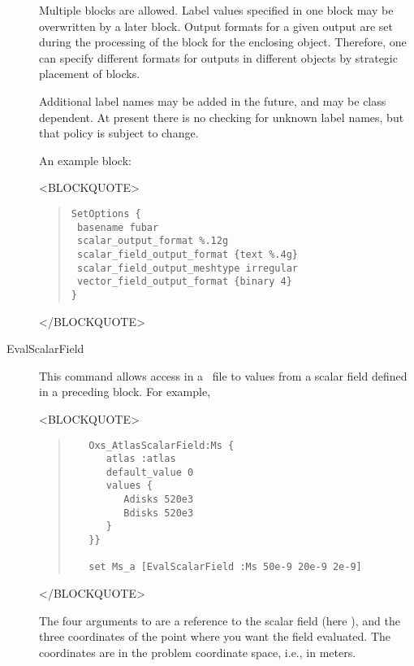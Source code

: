 \begin{description}
Multiple  blocks are allowed.  Label values specified
in one  block may be overwritten by a later
 block.  Output formats for a given output are
set during the processing of the  block for the enclosing
 object.  Therefore, one can specify different formats
for outputs in different  objects by strategic placement
of  blocks.

Additional label names may be added in the future, and may be
 class dependent.  At present there is no checking for
unknown label names, but that policy is subject to change.

An example  block:
\begin{rawhtml}<BLOCKQUOTE>\end{rawhtml}
\begin{quote}
\begin{verbatim}
SetOptions {
 basename fubar
 scalar_output_format %.12g
 scalar_field_output_format {text %.4g}
 scalar_field_output_meshtype irregular
 vector_field_output_format {binary 4}
}
\end{verbatim}
\end{quote}
\begin{rawhtml}</BLOCKQUOTE>\end{rawhtml}



\item[EvalScalarField\label{html:mif2EvalScalarField}]
This command allows access in a \MIF\ file to values from a scalar field
defined in a preceding  block.  For example,
\begin{rawhtml}<BLOCKQUOTE>\end{rawhtml}
\begin{quote}
\begin{verbatim}
   Oxs_AtlasScalarField:Ms {
      atlas :atlas
      default_value 0
      values {
         Adisks 520e3
         Bdisks 520e3
      }
   }}

   set Ms_a [EvalScalarField :Ms 50e-9 20e-9 2e-9]
\end{verbatim}
\end{quote}
\begin{rawhtml}</BLOCKQUOTE>\end{rawhtml}
The four arguments to  are a reference to the scalar
field (here ), and the three coordinates of the point where you
want the field evaluated.  The coordinates are in the problem coordinate
space, i.e., in meters.


\end{description}
